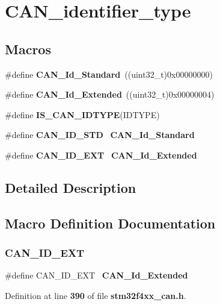 \section{C\+A\+N\+\_\+identifier\+\_\+type}
\label{group__CAN__identifier__type}
\subsection*{Macros}
\begin{DoxyCompactItemize}
\item 
\#define \textbf{ C\+A\+N\+\_\+\+Id\+\_\+\+Standard}~((uint32\+\_\+t)0x00000000)
\item 
\#define \textbf{ C\+A\+N\+\_\+\+Id\+\_\+\+Extended}~((uint32\+\_\+t)0x00000004)
\item 
\#define \textbf{ I\+S\+\_\+\+C\+A\+N\+\_\+\+I\+D\+T\+Y\+PE}(I\+D\+T\+Y\+PE)
\item 
\#define \textbf{ C\+A\+N\+\_\+\+I\+D\+\_\+\+S\+TD}~\textbf{ C\+A\+N\+\_\+\+Id\+\_\+\+Standard}
\item 
\#define \textbf{ C\+A\+N\+\_\+\+I\+D\+\_\+\+E\+XT}~\textbf{ C\+A\+N\+\_\+\+Id\+\_\+\+Extended}
\end{DoxyCompactItemize}


\subsection{Detailed Description}


\subsection{Macro Definition Documentation}
\mbox{\label{group__CAN__identifier__type_ga5f6fdd1dc3d312af1ac30e2eee15d6f0}} 
\subsubsection{C\+A\+N\+\_\+\+I\+D\+\_\+\+E\+XT}
{\footnotesize\ttfamily \#define C\+A\+N\+\_\+\+I\+D\+\_\+\+E\+XT~\textbf{ C\+A\+N\+\_\+\+Id\+\_\+\+Extended}}



Definition at line \textbf{ 390} of file \textbf{ stm32f4xx\+\_\+can.\+h}.

